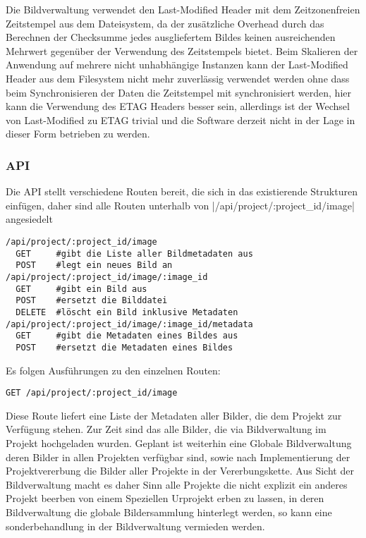Die Bildverwaltung verwendet den Last-Modified Header mit dem Zeitzonenfreien
Zeitstempel aus dem Dateisystem, da der zusätzliche Overhead durch das Berechnen
der Checksumme jedes ausgliefertem Bildes keinen ausreichenden Mehrwert
gegenüber der Verwendung des Zeitstempels bietet. Beim Skalieren der Anwendung
auf mehrere nicht unhabhängige Instanzen kann der Last-Modified Header aus dem
Filesystem nicht mehr zuverlässig verwendet werden ohne dass beim
Synchronisieren der Daten die Zeitstempel mit synchronisiert werden, hier kann
die Verwendung des ETAG Headers besser sein, allerdings ist der Wechsel von
Last-Modified zu ETAG trivial und die Software derzeit nicht in der Lage in
dieser Form betrieben zu werden.

\subsubsection{API}

Die API stellt verschiedene Routen bereit, die sich in das existierende
Strukturen einfügen, daher sind alle Routen unterhalb von
|/api/project/:project_id/image| angesiedelt

\begin{verbatim}
/api/project/:project_id/image
  GET     #gibt die Liste aller Bildmetadaten aus
  POST    #legt ein neues Bild an
/api/project/:project_id/image/:image_id
  GET     #gibt ein Bild aus
  POST    #ersetzt die Bilddatei
  DELETE  #löscht ein Bild inklusive Metadaten
/api/project/:project_id/image/:image_id/metadata
  GET     #gibt die Metadaten eines Bildes aus
  POST    #ersetzt die Metadaten eines Bildes
\end{verbatim}

Es folgen Ausführungen zu den einzelnen Routen:

\begin{verbatim}
GET /api/project/:project_id/image
\end{verbatim}

Diese Route liefert eine Liste der Metadaten aller Bilder, die dem Projekt zur
Verfügung stehen. Zur Zeit sind das alle Bilder, die via Bildverwaltung im
Projekt hochgeladen wurden. Geplant ist weiterhin eine Globale Bildverwaltung
deren Bilder in allen Projekten verfügbar sind, sowie nach Implementierung der
Projektvererbung die Bilder aller Projekte in der Vererbungskette. Aus Sicht der
Bildverwaltung macht es daher Sinn alle Projekte die nicht explizit ein anderes
Projekt beerben von einem Speziellen Urprojekt erben zu lassen, in deren
Bildverwaltung die globale Bildersammlung hinterlegt werden, so kann eine
sonderbehandlung in der Bildverwaltung vermieden werden.

